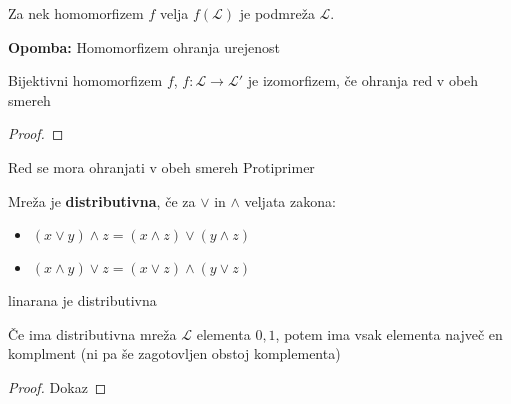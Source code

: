 \documentclass[slovene]{beamer}
\newenvironment{remark}
{\textbf{Opomba:}}
{}
\begin{document}
\begin{frame}
\begin{theorem}
Za nek homomorfizem $f$ velja $f(\mathcal{L})$ je podmreža $\mathcal{L}$.
\end{theorem}

\begin{remark}
Homomorfizem ohranja urejenost
\end{remark}
\end{frame}


\begin{frame}

\begin{theorem}
Bijektivni homomorfizem $f$, $f : \mathcal{L} \to \mathcal{L}'$ je izomorfizem, če ohranja red v obeh smereh
\end{theorem}

\begin{proof}

\end{proof}

\end{frame}

\begin{frame}
\begin{block}{Red se mora ohranjati v obeh smereh}
Protiprimer
\end{block}
\end{frame}


\begin{frame}
\begin{definition}
Mreža je \textbf{distributivna}, če za $\lor$ in $\land$ veljata zakona:
\begin{itemize}
\item $(x \lor y) \land z = (x \land z) \lor (y \land z)$
\item $(x \land y) \lor z = (x \lor z) \land (y \lor z)$
\end{itemize}
\end{definition}


\begin{example}
linarana je distributivna
\end{example}

\end{frame}

\begin{frame}
\begin{theorem}
Če ima distributivna mreža $\mathcal{L}$ elementa $0,1$, potem ima vsak elementa največ en komplment (ni pa še zagotovljen obstoj komplementa)
\end{theorem}

\begin{proof}
Dokaz
\end{proof}

\end{frame}
\end{document}
